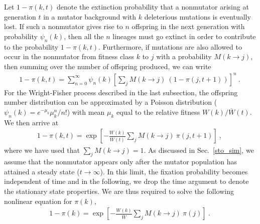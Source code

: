 \documentclass[preprint,12pt,number]{elsarticle}
\begin{document}
Let $1-\pi(k,t)$ denote the extinction probability that a nonmutator arising at generation $t$ in a mutator background with $k$ deleterious mutations is eventually lost. If such a nonmutator gives rise to $n$ offspring in the next generation with probability $\psi_n (k)$, then all the $n$ lineages must go extinct in order to contribute to the probability $1- \pi(k,t)$.  Furthermore, if  mutations are also allowed to occur in the nonmutator from fitness class $k$ to $j$ with a probability $M(k\rightarrow j)$, then summing over the number of offspring produced, we can write \citep{Johnson:2002}
\begin{eqnarray}
\label{extprob1} 
1-\pi(k,t) = \sum_{n=0}^{\infty} \psi_n (k) \left[\sum_{j} M(k\rightarrow j) ~ (1-\pi(j,t+1)) \right]^n  ~.~
\end{eqnarray}
For the Wright-Fisher process described in the last subsection, the offspring number distribution can be approximated by a Poisson distribution ($\psi_n (k)=e^{-\mu_k} \mu_k^n/n!$) with mean $\mu_k$ equal to the relative fitness ${W(k)}/{\overline W(t)}$. We then arrive at 
\begin{eqnarray}
\label{extprob22} 
1-\pi(k,t) =  \exp\left[- \frac{W(k)}{\overline W(t)} \sum_{j} M(k\rightarrow j) ~ \pi(j,t+1) \right]  ~,~
\end{eqnarray}
where we have used that $\sum_j M(k\rightarrow j)=1$. As discussed in Sec.~\ref{sto_sim}, we assume that the nonmutator   appears only after the mutator population has attained a steady state ($t \to \infty$). In this limit, the fixation probability becomes independent of time and in the following, we drop the time argument to denote the stationary state properties.  We are thus required to solve the following nonlinear equation for $\pi(k)$, 
\begin{eqnarray}
\label{extprob2} 
1-\pi(k) =  \exp\left[- \frac{W(k)}{\overline W} \sum_{j} M(k\rightarrow j) ~ \pi(j) \right]  ~.~
\end{eqnarray}
\end{document}
